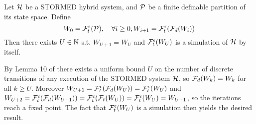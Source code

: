 \begin{thm}
	\label{thm:finite simulation}
	Let $\mathcal{H}$ be a STORMED hybrid system, 
	and $\mathcal{P}$ be a finite definable partition of its state space.
	Define 
	\begin{equation}
	\label{eq:Fte,Fde}
W_0 = \mathcal{F}_t^\epsilon(\mathcal{P}), \quad \forall i\geq 0, W_{i+1} = \mathcal{F}_t^\epsilon(\mathcal{F}_d(W_i))
	\end{equation}
Then there exists $U \in \mathbb{N}$ s.t. $W_{U+1} = W_U$ and $\mathcal{F}_t^\epsilon(W_U)$ is a simulation of $\mathcal{H}$ by itself.
\end{thm}

\begin{prf}
By Lemma 10 of \cite{VladimerouPVD08_STORMED} there exists a uniform bound $U$ on the number of discrete transitions of any execution of the STORMED system $\mathcal{H}$, so $\mathcal{F}_d(W_k) = W_k$ for all $k\geq U$.
Moreover 
$W_{U+1} = \mathcal{F}_t^\epsilon(\mathcal{F}_d(W_U)) = \mathcal{F}_t^\epsilon(W_U)$
and $W_{U+2}= \mathcal{F}_t^\epsilon(\mathcal{F}_d(W_{U+1}))= \mathcal{F}_t^\epsilon(\mathcal{F}_t(W_U)) = \mathcal{F}_t^\epsilon(W_U) = W_{U+1}$, so the iterations reach a fixed point.
The fact that $\mathcal{F}_t^\epsilon(W_U)$ is a simulation then yields the desired result.
\end{prf}
%


